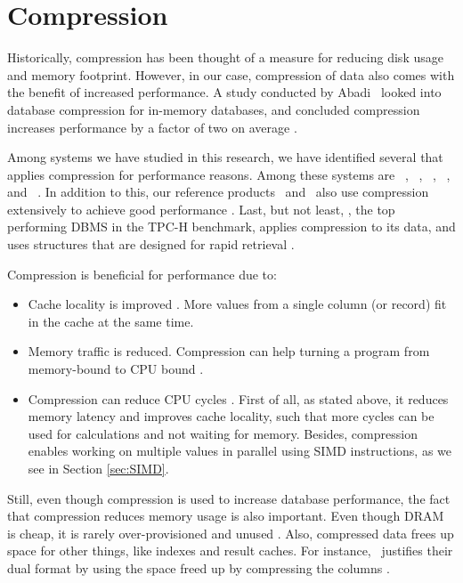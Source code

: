 \section{Compression}
\label{sec:Compression}
Historically, compression has been thought of a measure for reducing disk usage and memory footprint. However, in our case, compression of data also comes with the benefit of increased performance. A study conducted by Abadi \ea~looked into database compression for in-memory databases, and concluded compression increases performance by a factor of two on average \cite{Abadi2008-dd}.

Among systems we have studied in this research, we have identified several that applies compression for performance reasons. Among these systems are \ibm~\cite{Raman2013-em}, \cstore~\cite{Stonebraker2005-qz}, \vertica~\cite{Lamb2012-kg}, \oracle~\cite{Oracle2015-fs}, and \gorilla~\cite{Pelkonen2015-ko}. In addition to this, our reference products \tableau~and \qlikview~also use compression extensively to achieve good performance \cite{Kamkolkar2015-iq, Qlik2014-vd}. Last, but not least, \exasol, the top performing DBMS in the TPC-H benchmark, applies compression to its data, and uses structures that are designed for rapid retrieval \cite{Exasol2014-xh}.


Compression is beneficial for performance due to:
\begin{itemize}
  \item Cache locality is improved \cite{Exasol2014-xh}. More values from a single column (or record) fit in the cache at the same time.
  \item Memory traffic is reduced. Compression can help turning a program from memory-bound to CPU bound \cite{Willhalm2009-hu}.
  \item Compression can reduce CPU cycles \cite{Stonebraker2005-qz}. First of all, as stated above, it reduces memory latency and improves cache locality, such that more cycles can be used for calculations and not waiting for memory. Besides, compression enables working on multiple values in parallel using SIMD instructions, as we see in Section \ref{sec:SIMD}.
\end{itemize}

Still, even though compression is used to increase database performance, the fact that compression reduces memory usage is also important. Even though DRAM is cheap, it is rarely over-provisioned and unused \cite{Barber2014-ey}. Also, compressed data frees up space for other things, like indexes and result caches. For instance, \oracle~justifies their dual format by using the space freed up by compressing the columns \cite{Lahiri2015-mz, Lamb2012-kg}.

